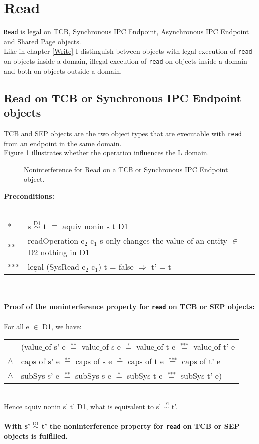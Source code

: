 \section{Read}\label{sec:Read}
\texttt{Read} is legal on TCB, Synchronous IPC Endpoint, Asynchronous IPC Endpoint and Shared Page objects. \\
Like in chapter \ref{Write} I distinguish between objects with legal execution of \texttt{read} on objects inside a domain, illegal execution of \texttt{read} on objects inside a domain and both on objects outside a domain.
\subsection{Read on TCB or Synchronous IPC Endpoint objects}
TCB and SEP objects are the two object types that are executable with \texttt{read} from an endpoint in the same domain. \\
Figure \ref{fig:ReadTCB} illustrates whether the operation influences the L domain.
\begin{figure}[H]
\caption{Noninterference for Read on a TCB or Synchronous IPC Endpoint object.}
\label{fig:ReadTCB}
\end{figure}
\textbf{Preconditions:} \\ \\
\begin{tabular}{ll}
* & s $\overset{\text{D1}}{\sim}$ t $\equiv$ aquiv$\_$nonin s t D1	\\ 
** & readOperation e$_2$ c$_1$ s only changes the value of an entity $\in$ D2 nothing in D1 \\ 
*** & legal (SysRead e$_2$ c$_1$) t = false $\Rightarrow$ t' = t
\end{tabular} \\ \\ 
\textbf{Proof of the noninterference property for \texttt{read} on TCB or SEP objects:}\\ \\
For all e $\in$ D1, we have: \\ 
\begin{tabular}{ll}
& (value$\_$of s' e $\overset{\text{**}}{=}$ value$\_$of s e $\overset{\text{*}}{=}$ value$\_$of t e $\overset{\text{***}}{=}$ value$\_$of t' e \\
$\wedge$ & caps$\_$of s' e $\overset{\text{**}}{=}$ caps$\_$of s e $\overset{\text{*}}{=}$ caps$\_$of t e $\overset{\text{***}}{=}$ caps$\_$of t' e \\
$\wedge$ & subSys s' e $\overset{\text{**}}{=}$ subSys s e $\overset{\text{*}}{=}$ subSys t e $\overset{\text{***}}{=}$ subSys t' e)
\end{tabular} \\
Hence aquiv$\_$nonin s' t' D1, what is equivalent to s' $\overset{\text{D1}}{\sim}$ t'. \\ \\
\textbf{With s' $\overset{\text{D1}}{\sim}$ t' the noninterference property for \texttt{read} on TCB or SEP objects is fulfilled.}  
